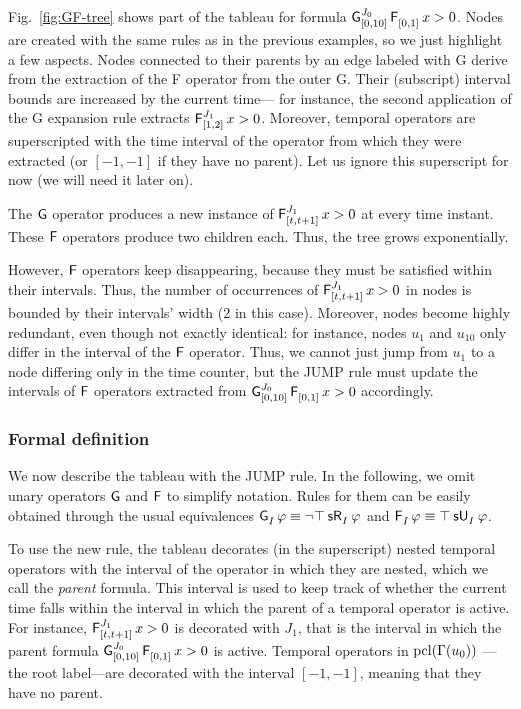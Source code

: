\documentclass[acmsmall,screen]{acmart}
\begin{document}
Fig.~\ref{fig:GF-tree} shows part of the tableau for formula $\glob[J_0]{[0,10]} \even{[0,1]} x > 0$.
Nodes are created with the same rules as in the previous examples, so we just highlight a few aspects.
Nodes connected to their parents by an edge labeled with \textsf{G} derive from the extraction of the \textsf{F} operator from the outer \textsf{G}.
Their (subscript) interval bounds are increased by the current time---%
for instance, the second application of the \textsf{G} expansion rule extracts $\even[J_1]{[1,2]} x > 0$.
Moreover, temporal operators are superscripted with the time interval of the operator from which they were extracted (or $[-1,-1]$ if they have no parent).
Let us ignore this superscript for now (we will need it later on).

The $\globop$ operator produces a new instance of $\even[J_1]{[t,t+1]} x > 0$ at every time instant.
These $\evenop$ operators produce two children each.
Thus, the tree grows exponentially.

However, $\evenop$ operators keep disappearing, because they must be satisfied within their intervals.
Thus, the number of occurrences of $\even[J_1]{[t,t+1]} x > 0$ in nodes is bounded by their intervals' width (2 in this case).
Moreover, nodes become highly redundant, even though not exactly identical:
for instance, nodes $u_1$ and $u_{10}$ only differ in the interval of the $\evenop$ operator.
Thus, we cannot just jump from $u_1$ to a node differing only in the time counter,
but the \textsf{JUMP} rule must update the intervals of $\evenop$ operators extracted from $\glob[J_0]{[0,10]} \even{[0,1]} x > 0$ accordingly.

\subsubsection{Formal definition}
We now describe the tableau with the \textsc{JUMP} rule.
In the following, we omit unary operators $\globop$ and $\evenop$ to simplify notation.
Rules for them can be easily obtained through the usual equivalences
$\glob{I} \varphi \equiv \srelease{I}{\neg \top}{\varphi}$ and $\even{I} \varphi \equiv \suntil{I}{\top}{\varphi}$.

To use the new rule, the tableau decorates (in the superscript) nested temporal operators
with the interval of the operator in which they are nested,
which we call the \emph{parent} formula.
This interval is used to keep track of whether the current time falls within
the interval in which the parent of a temporal operator is active.
For instance, $\even[J_1]{[t,t+1]} x > 0$ is decorated with $J_1$,
that is the interval in which the parent formula $\glob[J_0]{[0,10]} \even{[0,1]} x > 0$ is active.
Temporal operators in $\pcl(\Gamma(u_0))$%
---the root label---are decorated with the interval $[-1,-1]$,
meaning that they have no parent.
\end{document}
